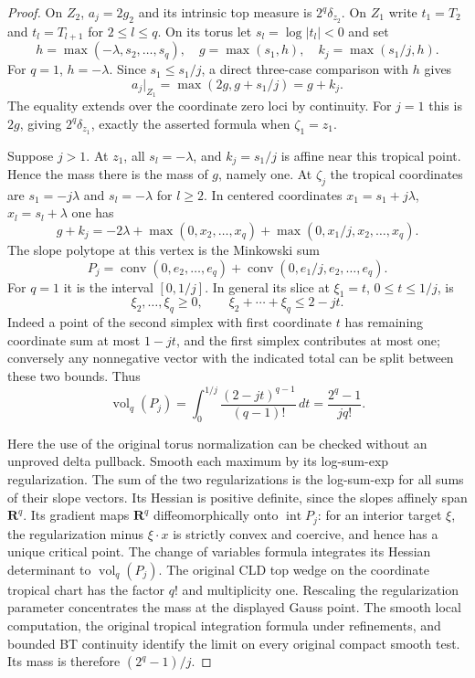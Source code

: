 \documentclass[11pt,a4paper]{article}
\numberwithin{equation}{section}
\theoremstyle{definition}
\theoremstyle{remark}
\begin{document}
\begin{proof}
On $Z_2$, $a_j=2g_2$ and its intrinsic top measure is
$2^q\delta_{z_2}$. On $Z_1$ write $t_1=T_2$ and
$t_l=T_{l+1}$ for $2\leq l\leq q$. On its torus let
$s_l=\log|t_l|<0$ and set
\[
 h=\max(-\lambda,s_2,\ldots,s_q),\quad
 g=\max(s_1,h),\quad k_j=\max(s_1/j,h).
\]
For $q=1$, $h=-\lambda$. Since $s_1\leq s_1/j$, a direct
three-case comparison with $h$ gives
\begin{equation}
 a_j|_{Z_1}=\max(2g,g+s_1/j)=g+k_j.
 \label{eq:r3-relative-radial-two-maxima}
\end{equation}
The equality extends over the coordinate zero loci by continuity.
For $j=1$ this is $2g$, giving $2^q\delta_{z_1}$, exactly the
asserted formula when $\zeta_1=z_1$.

Suppose $j>1$. At $z_1$, all $s_l=-\lambda$, and $k_j=s_1/j$
is affine near this tropical point. Hence the mass there is the
mass of $g$, namely one. At $\zeta_j$ the tropical coordinates
are $s_1=-j\lambda$ and $s_l=-\lambda$ for $l\geq2$. In centered
coordinates $x_1=s_1+j\lambda$, $x_l=s_l+\lambda$ one has
\[
 g+k_j=-2\lambda+
       \max(0,x_2,\ldots,x_q)
       +\max(0,x_1/j,x_2,\ldots,x_q).
\]
The slope polytope at this vertex is the Minkowski sum
\begin{equation}
 P_j=\operatorname{conv}(0,e_2,\ldots,e_q)
           +\operatorname{conv}(0,e_1/j,e_2,\ldots,e_q).
 \label{eq:r3-relative-shell-polytope}
\end{equation}
For $q=1$ it is the interval $[0,1/j]$. In general its slice at
$\xi_1=t$, $0\leq t\leq1/j$, is
\[
 \xi_2,\ldots,\xi_q\geq0,\qquad
             \xi_2+\cdots+\xi_q\leq2-jt.
\]
Indeed a point of the second simplex with first coordinate $t$
has remaining coordinate sum at most $1-jt$, and the first
simplex contributes at most one; conversely any nonnegative
vector with the indicated total can be split between these
two bounds. Thus
\[
 \operatorname{vol}_q(P_j)
 =\int_0^{1/j}\frac{(2-jt)^{q-1}}{(q-1)!}\,dt
 =\frac{2^q-1}{j q!}.
\]

Here the use of the original torus normalization can be checked
without an unproved delta pullback. Smooth each maximum by its
log-sum-exp regularization. The sum of the two regularizations is
the log-sum-exp for all sums of their slope vectors. Its Hessian
is positive definite, since the slopes affinely span $\mathbf R^q$.
Its gradient maps $\mathbf R^q$ diffeomorphically onto
$\operatorname{int}P_j$: for an interior target $\xi$, the
regularization minus $\xi\cdot x$ is strictly convex and coercive,
and hence has a unique critical point. The change of variables
formula integrates its Hessian determinant to
$\operatorname{vol}_q(P_j)$. The original CLD top wedge on the
coordinate tropical chart has the factor $q!$ and multiplicity
one. Rescaling the regularization parameter concentrates the
mass at the displayed Gauss point. The smooth local computation,
the original tropical integration formula under refinements,
and bounded BT continuity identify the limit on every original
compact smooth test. Its mass is therefore $(2^q-1)/j$.


\end{proof}
\end{document}
